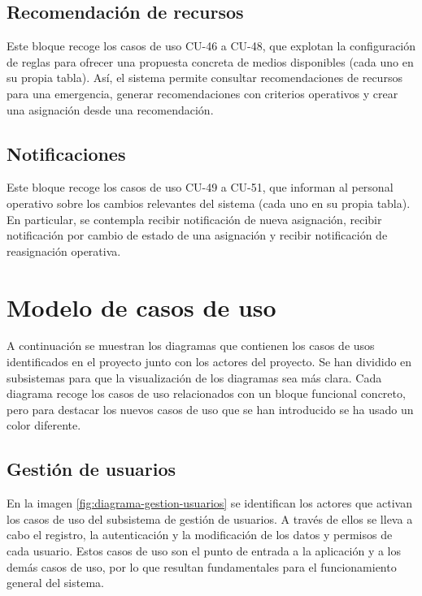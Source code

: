 

\newpage
\subsection{Recomendación de recursos}

Este bloque recoge los casos de uso CU-46 a CU-48, que explotan la configuración de reglas para ofrecer una propuesta concreta de medios disponibles (cada uno en su propia tabla). Así, el sistema permite consultar recomendaciones de recursos para una emergencia, generar recomendaciones con criterios operativos y crear una asignación desde una recomendación.



\subsection{Notificaciones}

Este bloque recoge los casos de uso CU-49 a CU-51, que informan al personal operativo sobre los cambios relevantes del sistema (cada uno en su propia tabla). En particular, se contempla recibir notificación de nueva asignación, recibir notificación por cambio de estado de una asignación y recibir notificación de reasignación operativa.





\newpage
\section{Modelo de casos de uso}

A continuación se muestran los diagramas que contienen los casos de usos identificados
en el proyecto junto con los actores del proyecto. Se han dividido en subsistemas para que la visualización de los diagramas sea más clara. Cada diagrama recoge los casos de uso relacionados con un bloque funcional concreto, pero para destacar los nuevos casos de uso que se han introducido se ha usado un color diferente. 

\subsection{Gestión de usuarios}

En la imagen \ref{fig:diagrama-gestion-usuarios} se identifican los actores que activan los casos de uso del subsistema de gestión de usuarios. A través de ellos se lleva a cabo el registro, la autenticación y la modificación de los datos y permisos de cada usuario. Estos casos de uso son el punto de entrada a la aplicación y a los demás casos de uso, por lo que resultan fundamentales para el funcionamiento general del sistema.



